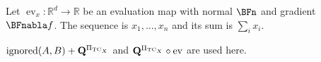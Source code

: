 \documentclass{localbold}
\newcommand{\R}{\mathbb{R}}
\DeclareMathOperator{\ev}{ev}
\begin{document}
Let $\ev_x:\R^d\to\R$ be an evaluation map with normal $\BFn$ and gradient
$\BFnabla f$. The sequence is $x_1,\dots,x_n$ and its sum is $\sum_i x_i$.

\newcommand{\MidMacro}{\QTC\circ\ev}


$\operatorname{ignored}(A,B)+\mathbf{Q}^{\Pi_{\operatorname{TC}_X}}$ and $\MidMacro$ are used here.
\end{document}
